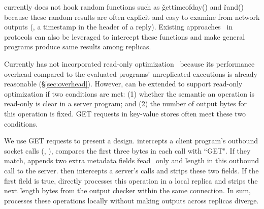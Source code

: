 
\xxx currently does not hook random functions such as \v{gettimeofday()} and 
\v{rand()} because these random results are often explicit and easy to examine 
from network outputs (\eg, a timestamp in the header of a reply). Existing 
approaches~\cite{eve:osdi12,paxos:practical} in \paxos protocols can also be 
leveraged to intercept these functions and make general programs produce same 
results among replicas.




Currently \xxx has not incorporated read-only optimization~\cite{eve:osdi12} 
because its performance overhead compared to the evaluated programs' 
unreplicated executions is already reasonable (\S\ref{sec:overhead}). However, 
\xxx can be extended to support read-only optimization if two conditions are 
met: (1) whether the semantic an operation is read-only is clear in a server 
program; and (2) the number of output bytes for this operation is fixed. GET 
requests in key-value stores often meet these two conditions.

We use GET requests to present a design. \xxx intercepts a client program's 
outbound socket calls (\eg, \send), compares the first three bytes in each call 
with ``GET". If they match, \xxx appends two extra \xxx metadata fields 
\v{read\_only} and \v{length} in this outbound call to the server. \xxx then 
intercepts a server's \recv calls and strips these two fields. If the first 
field is true, \xxx directly processes this operation in a local replica 
and strips the next \v{length} bytes from the output checker within the same
connection. In sum, \xxx processes these operations locally without making 
outputs across replicas diverge.

